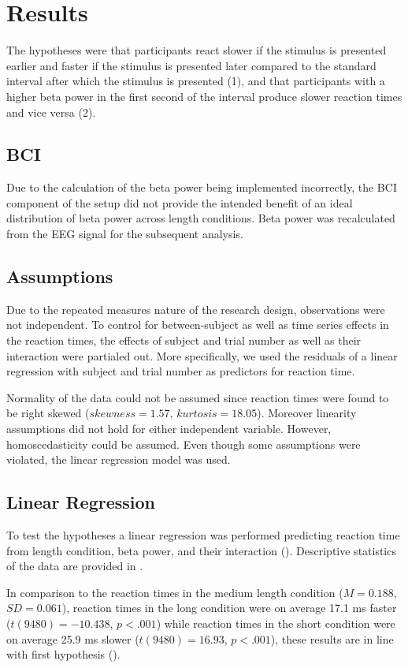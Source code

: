 \documentclass[man,floatsintext]{apa6} %
\begin{document}
\section{Results}
The hypotheses were that participants react slower if the stimulus is presented earlier and faster if the stimulus is presented later compared to the standard interval after which the stimulus is presented (1), and that participants with a higher beta power in the first second of the interval produce slower reaction times and vice versa (2).

\subsection{BCI}
Due to the calculation of the beta power being implemented incorrectly, the BCI component of the
setup did not provide the intended benefit of an ideal distribution of beta power across length conditions. Beta power was recalculated from the EEG signal for the subsequent analysis.

\subsection{Assumptions}
Due to the repeated measures nature of the research design, observations were not independent. To control for between-subject as well as time series effects in the reaction times, the effects of subject and trial number as well as their interaction were partialed out. More specifically, we used the residuals of a linear regression with subject and trial number as predictors for reaction time.

Normality of the data could not be assumed since reaction times were found to be right skewed ($skewness = 1.57$, $kurtosis = 18.05$). Moreover linearity assumptions did not hold for either independent variable. However, homoscedasticity could be assumed. Even though some assumptions were violated, the linear regression model was used.

\subsection{Linear Regression}
To test the hypotheses a linear regression was performed predicting reaction time from length condition, beta power, and their interaction (). Descriptive statistics of the data are provided in .

In comparison to the reaction times in the medium length condition ($M = 0.188$, $SD = 0.061$), reaction times in the long condition were on average 17.1 ms faster ($t(9480) = -10.438$, $p < .001$) while reaction times in the short condition were on average 25.9 ms slower ($t(9480) = 16.93$, $p < .001$), these results are in line with first hypothesis ().
\end{document}
